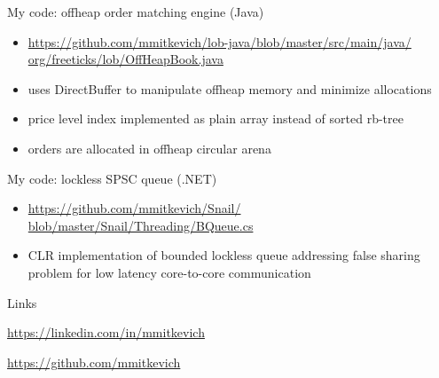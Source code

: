 \documentclass[10pt]{beamer}
\begin{document}
\begin{frame}{My code: offheap order matching engine (Java)}
\begin{itemize}
	\item \href{https://github.com/mmitkevich/lob-java/blob/master/src/main/java/org/freeticks/lob/OffHeapBook.java}
	{https://github.com/mmitkevich/lob-java/blob/master/src/main/java/
		org/freeticks/lob/OffHeapBook.java}
	\item uses DirectBuffer  to manipulate offheap memory and minimize allocations
	\item price level index implemented as plain array instead of sorted rb-tree
	\item orders are allocated in offheap circular arena
\end{itemize}
\end{frame}

\begin{frame}[fragile]{My code: lockless SPSC queue (.NET)}
\begin{itemize}
	\item \href{https://github.com/mmitkevich/Snail/blob/master/Snail/Threading/BQueue.cs} {https://github.com/mmitkevich/Snail/
		blob/master/Snail/Threading/BQueue.cs}
	\item CLR implementation of bounded lockless queue addressing false sharing problem for low latency core-to-core communication
\end{itemize}
\end{frame}

\begin{frame}{Links}

 	 \begin{center}\href{https://linkedin.com/in/mmitkevich}{https://linkedin.com/in/mmitkevich}\end{center}
 	 \begin{center}\href{https://github.com/mmitkevich}{https://github.com/mmitkevich}\end{center}

\end{frame}
\end{document}
